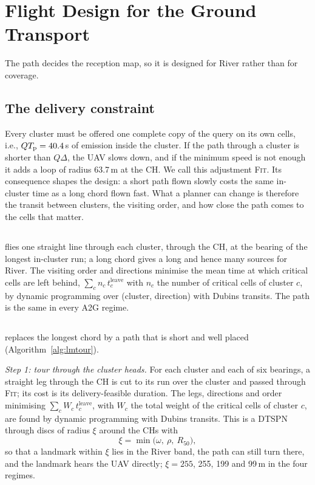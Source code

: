 \section{Flight Design for the Ground Transport}\label{sec:flight}
The path decides the reception map, so it is designed for River rather than for coverage.

\subsection{The delivery constraint}
Every cluster must be offered one complete copy of the query on its own cells, i.e., $QT_{\mathrm p}=40.4$\,s of emission inside
the cluster. If the path through a cluster is shorter than $Q\Delta$, the UAV slows down, and if the minimum speed is not
enough it adds a loop of radius 63.7\,m at the CH. We call this adjustment \textsc{Fit}. Its consequence shapes the
design: a short path flown slowly costs the same in-cluster time as a long chord flown fast. What a planner can change
is therefore the transit between clusters, the visiting order, and how close the path comes to the cells that matter.

\subsection{\chord}
\chord{} flies one straight line through each cluster, through the CH, at the bearing of the longest in-cluster run; a
long chord gives a long \spine{} and hence many sources for River. The visiting order and directions minimise the mean
time at which critical cells are left behind, $\sum_c n_c\,t^{\mathrm{leave}}_c$ with $n_c$ the number of critical cells
of cluster $c$, by dynamic programming over (cluster, direction) with Dubins transits. The path is the same in every
A2G regime.

\subsection{\lmtour}
\lmtour{} replaces the longest chord by a path that is short and well placed (Algorithm~\ref{alg:lmtour}).

\emph{Step 1: tour through the cluster heads.} For each cluster and each of six bearings, a straight leg through the CH
is cut to its run over the cluster and passed through \textsc{Fit}; its cost is its delivery-feasible duration. The
legs, directions and order minimising $\sum_cW_c\,t^{\mathrm{leave}}_c$, with $W_c$ the total weight of the critical
cells of cluster $c$, are found by dynamic programming with Dubins transits. This is a DTSPN through discs of radius
$\xi$ around the CHs with
\begin{equation}
\xi=\min\bigl(\omega,\ \rho,\ R_{50}\bigr),
\end{equation}
so that a landmark within $\xi$ lies in the River band, the path can still turn there, and the landmark hears the UAV
directly; $\xi=255$, 255, 199 and 99\,m in the four regimes.

